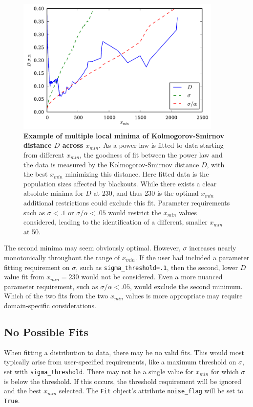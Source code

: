 \documentclass[10pt]{article}
\begin{document}
\begin{figure}[!ht]
\begin{center}
\includegraphics[width=4in]{FigD.pdf}
\end{center}
\caption{
{\bf Example of multiple local minima of Kolmogorov-Smirnov distance $D$ across $x_{min}$.} As a power law is fitted to data starting from different $x_{min}$, the goodness of fit between the power law and the data is measured by the Kolmogorov-Smirnov distance $D$, with the best $x_{min}$ minimizing this distance. Here fitted data is the population sizes affected by blackouts. While there exists a clear absolute minima for $D$ at 230, and thus 230 is the optimal $x_{min}$ additional restrictions could exclude this fit. Parameter requirements such as $\sigma<.1$ or $\sigma /\alpha<.05$ would restrict the $x_{min}$ values considered, leading to the identification of a different, smaller $x_{min}$ at 50.
}
\label{Ds}
\end{figure}

The second minima may seem obviously optimal. However, $\sigma$ increases nearly monotonically throughout the range of $x_{min}$. If the user had included a parameter fitting requirement on $\sigma$, such as \verb$sigma_threshold=.1$, then the second, lower $D$ value fit from $x_{min}=230$ would not be considered. Even a more nuanced parameter requirement, such as $\sigma / \alpha < .05$, would exclude the second minimum. Which of the two fits from the two $x_{min}$ values is more appropriate may require domain-specific considerations. 

\subsection*{No Possible Fits}
When fitting a distribution to data, there may be no valid fits. This would most typically arise from user-specified requirements, like a maximum threshold on $\sigma$, set with \verb$sigma_threshold$. There may not be a single value for $x_{min}$ for which $\sigma$ is below the threshold. If this occurs, the threshold requirement will be ignored and the best $x_{min}$ selected. The \verb$Fit$ object's attribute \verb$noise_flag$ will be set to \verb$True$. 
\end{document}
